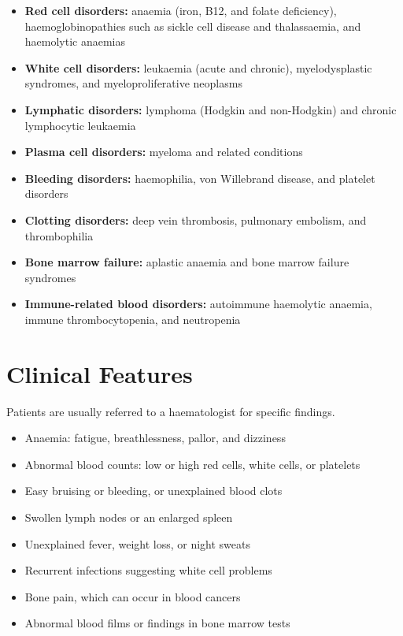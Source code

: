 \begin{itemize}
    \item \textbf{Red cell disorders:} anaemia (iron, B12, and folate deficiency), haemoglobinopathies such as sickle cell disease and thalassaemia, and haemolytic anaemias
    \item \textbf{White cell disorders:} leukaemia (acute and chronic), myelodysplastic syndromes, and myeloproliferative neoplasms
    \item \textbf{Lymphatic disorders:} lymphoma (Hodgkin and non-Hodgkin) and chronic lymphocytic leukaemia
    \item \textbf{Plasma cell disorders:} myeloma and related conditions
    \item \textbf{Bleeding disorders:} haemophilia, von Willebrand disease, and platelet disorders
    \item \textbf{Clotting disorders:} deep vein thrombosis, pulmonary embolism, and thrombophilia
    \item \textbf{Bone marrow failure:} aplastic anaemia and bone marrow failure syndromes
    \item \textbf{Immune-related blood disorders:} autoimmune haemolytic anaemia, immune thrombocytopenia, and neutropenia
\end{itemize}

\section*{Clinical Features}
Patients are usually referred to a haematologist for specific findings.

\begin{itemize}
    \item Anaemia: fatigue, breathlessness, pallor, and dizziness
    \item Abnormal blood counts: low or high red cells, white cells, or platelets
    \item Easy bruising or bleeding, or unexplained blood clots
    \item Swollen lymph nodes or an enlarged spleen
    \item Unexplained fever, weight loss, or night sweats
    \item Recurrent infections suggesting white cell problems
    \item Bone pain, which can occur in blood cancers
    \item Abnormal blood films or findings in bone marrow tests
\end{itemize}

